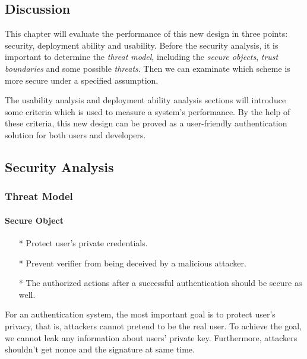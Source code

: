 \begin{CJK}{Bg5}{bsmi}


\chapter{Discussion}
\label{cha:discussion}

This chapter will evaluate the performance of this new design in three points: security, deployment ability and usability. Before the security analysis, it is important to determine the \emph{threat model}\cite{threat-model}, including the \emph{secure objects}, \emph{trust boundaries} and some possible \emph{threats}. Then we can examinate which scheme is more secure under a specified assumption.

The usability analysis and deployment ability analysis sections will introduce some criteria which is used to measure a system's performance. By the help of these criteria, this new design can be proved as a user-friendly authentication solution for both users and developers.

\section{Security Analysis}

\subsection{Threat Model}

\subsubsection{Secure Object}

\begin{enumerate}
\item[*] Protect user's private credentials.
\item[*] Prevent verifier from being deceived by a malicious attacker.
\\
\item[*] The authorized actions after a successful authentication should be secure as well.
\end{enumerate}

For an authentication system, the most important goal is to protect user's privacy, that is, attackers cannot pretend to be the real user. To achieve the goal, we cannot leak any information about users' private key. Furthermore, attackers shouldn't get nonce and the signature at same time.


\end{CJK}
